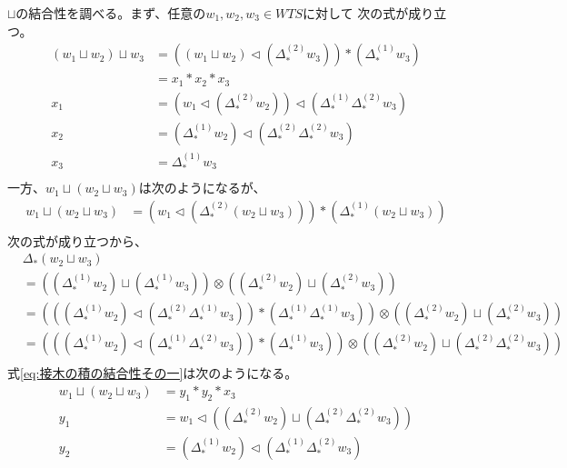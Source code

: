 	$\sqcup$の結合性を調べる。まず、任意の$w_1,w_2,w_3\in WTS$に対して
	次の式が成り立つ。
	\begin{equation}\begin{split} %
		(w_1\sqcup w_2)\sqcup w_3 
		&= \left((w_1\sqcup w_2)\lhd (\Delta_*^{(2)}w_3)\right)*(\Delta_*^{(1)}w_3) \\ 
		&= x_1*x_2*x_3 \\
		x_1 &= \left(w_1\lhd(\Delta_*^{(2)}w_2)\right)\lhd(\Delta_*^{(1)}\Delta_*^{(2)}w_3) \\
		x_2 &= (\Delta_*^{(1)}w_2)\lhd(\Delta_*^{(2)}\Delta_*^{(2)}w_3) \\
		x_3 &= \Delta_*^{(1)}w_3 \\
	\end{split}\end{equation} %
	一方、$w_1\sqcup(w_2\sqcup w_3)$は次のようになるが、
	\begin{equation}\label{eq:接木の積の結合性その一}\begin{split} %
		w_1\sqcup(w_2\sqcup w_3) 
		&= \left(w_1\lhd\left(\Delta_*^{(2)}(w_2\sqcup w_3)\right)\right)*\left(\Delta_*^{(1)}(w_2\sqcup w_3)\right) \\ 
	\end{split}\end{equation} %
	次の式が成り立つから、
	\begin{equation}\begin{split} %
		&\Delta_*(w_2\sqcup w_3) \\
		&= \left((\Delta_*^{(1)}w_2)\sqcup(\Delta_*^{(1)}w_3)\right)
		\otimes \left((\Delta_*^{(2)}w_2)\sqcup(\Delta_*^{(2)}w_3)\right) \\
		&= \left(\left((\Delta_*^{(1)}w_2)\lhd(\Delta_*^{(2)}\Delta_*^{(1)}w_3)\right)*(\Delta_*^{(1)}\Delta_*^{(1)}w_3)\right)\otimes \left((\Delta_*^{(2)}w_2)\sqcup(\Delta_*^{(2)}w_3)\right) \\
		&= \left(\left((\Delta_*^{(1)}w_2)\lhd(\Delta_*^{(1)}\Delta_*^{(2)}w_3)\right)*(\Delta_*^{(1)}w_3)\right)\otimes \left((\Delta_*^{(2)}w_2)\sqcup(\Delta_*^{(2)}\Delta_*^{(2)}w_3)\right) \\
	\end{split}\end{equation} %
	式\eqref{eq:接木の積の結合性その一}は次のようになる。
	\begin{equation}\begin{split} %
		w_1\sqcup(w_2\sqcup w_3) &= y_1*y_2*x_3 \\
		y_1 &= w_1\lhd\left((\Delta_*^{(2)}w_2)\sqcup(\Delta_*^{(2)}\Delta_*^{(2)}w_3)\right) \\
		y_2 &= (\Delta_*^{(1)}w_2)\lhd(\Delta_*^{(1)}\Delta_*^{(2)}w_3) \\
	\end{split}\end{equation} %
